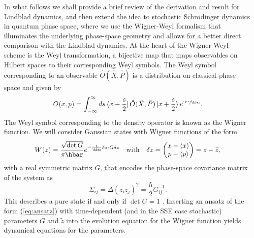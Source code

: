 \documentclass[12pt]{iopart} %
\begin{document}
In what follows we shall provide a brief review of the derivation and result for Lindblad dynamics, and then extend the idea to stochastic Schr\"odinger dynamics in quantum phase space, where we use the Wigner-Weyl formalism that illuminates the underlying phase-space geometry and allows for a better direct comparison with the Lindblad dynamics. At the heart of the Wigner-Weyl scheme is the Weyl transformation, a bijective map that maps observables on Hilbert spaces to their corresponding Weyl symbols. The Weyl symbol corresponding to an observable $\hat{O}(\hat{X},\hat{P})$ is a distribution on classical phase space and given by
\begin{equation}
	{O}(x,p)=\int_{-\infty}^{\infty}ds \bra{x-\frac{s}{2}}\hat{O}(\hat{X},\hat{P})\ket{x+\frac{s}{2}}e^{\sfrac{i p s}{\hbar}}.
\end{equation}
The Weyl symbol corresponding to the density operator is known as the Wigner function. We will consider Gaussian states with Wigner functions of the form 
\begin{equation} \label{eq:ansatz}
	\begin{aligned}
	W(z)=\frac{\sqrt{\det G}}{\pi \hbar}e^{-\frac{1}{\hbar} \delta z \cdot G \delta z}& &\text{with}& &\delta z =\begin{pmatrix}x-\braket{x} \\ p-\braket{p}\end{pmatrix} =z-\tilde{z},
	\end{aligned}
\end{equation}
with a real symmetric matrix $G$, that encodes the phase-space covariance matrix of the system as
\begin{equation} \label{eq:Covar}
    \Sigma_{ij}=\Delta(z_i z_j)^2=\frac{\hbar}{2}G^{-1}_{ij}.
\end{equation}
This describes a pure state if and only if $\det G=1$ \cite{adesso2014continuous}. Inserting an ansatz of the form (\ref{eq:ansatz}) with time-dependent (and in the SSE case stochastic) parameters $G$ and $\tilde z$ into the evolution equation for the Wigner function yields dynamical equations for the parameters. 
\end{document}
